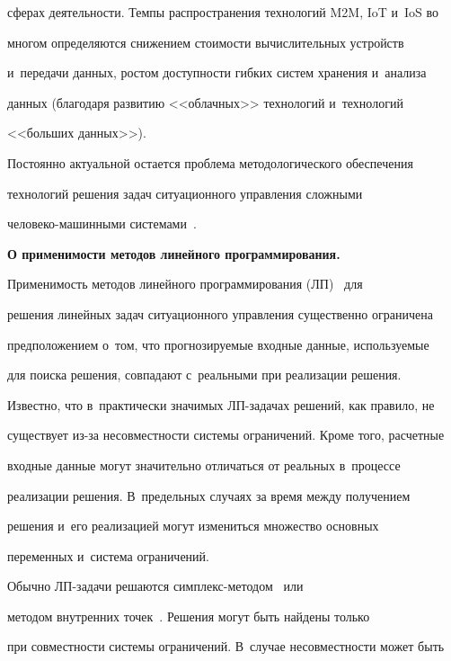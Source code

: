 сферах деятельности. Темпы распространения технологий M2M, IoT и~IoS во 


многом определяются снижением сто\-и\-мости вы\-чис\-ли\-тел\-ьных устройств 


и~передачи данных, рос\-том до\-ступ\-ности гиб\-ких сис\-тем хранения и~анализа 


данных (благодаря развитию <<облачных>> технологий и~технологий 


<<больших данных>>). 


  


  Постоянно актуальной остается проблема методологического обеспечения 


технологий решения задач ситуационного управ\-ле\-ния слож\-ны\-ми  


че\-ло\-ве\-ко-ма\-шин\-ны\-ми сис\-те\-ма\-ми~\cite{13-il, 14-il, 15-il, 16-il}.


  


  \textbf{О применимости методов линейного программирования.} 


Применимость методов линейного программирования (ЛП)~\cite{17-il} для 


решения линейных задач ситуационного управления существенно ограничена 


предположением о~том, что прогнозируемые входные данные, используемые 


для поиска решения, совпадают с~реальными при реализации решения. 


Известно, что в~практически значимых ЛП-за\-да\-чах решений, как правило, не 


существует из-за несовместности системы ограничений. Кроме того, расчетные 


входные данные могут значительно отличаться от реальных в~процессе 


реализации решения. В~предельных случаях за время между получением 


решения и~его реализацией могут измениться множество основных 


переменных и~система ограничений. 


  


  Обычно ЛП-задачи решаются сим\-плекс-ме\-то\-дом~\cite{17-il} или 


методом внутренних точек~\cite{18-il}. Решения могут быть найдены только 


при совместности системы ограничений. В~случае несовместности может быть 


